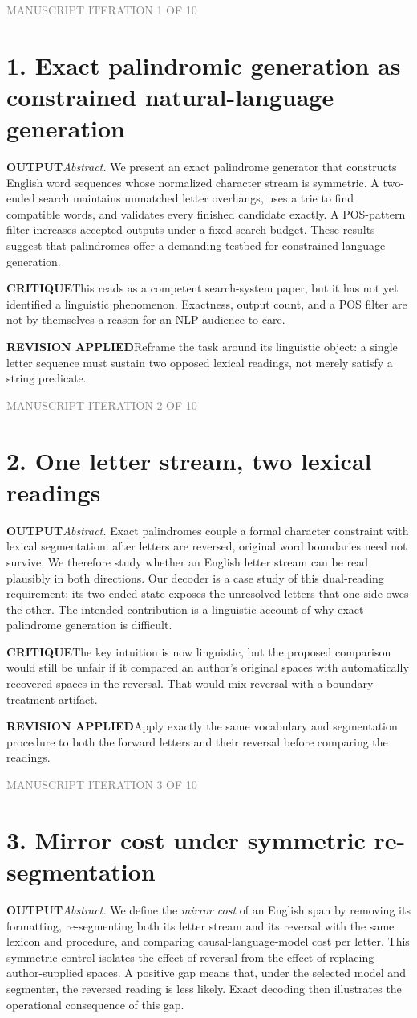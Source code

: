 \documentclass[10pt]{article}
\newcommand{\outputlabel}{\textcolor{teal!65!black}{\textbf{OUTPUT}}}
\newcommand{\critiquelabel}{\textcolor{red!65!black}{\textbf{CRITIQUE}}}
\newcommand{\reviselabel}{\textcolor{blue!65!black}{\textbf{REVISION APPLIED}}}
\newcommand{\pass}[1]{\textcolor{gray}{\small MANUSCRIPT ITERATION #1 OF 10}}
\begin{document}
\pass{1}
\section*{1. Exact palindromic generation as constrained natural-language generation}
\outputlabel\quad \emph{Abstract.} We present an exact palindrome generator that constructs English word sequences whose normalized character stream is symmetric. A two-ended search maintains unmatched letter overhangs, uses a trie to find compatible words, and validates every finished candidate exactly. A POS-pattern filter increases accepted outputs under a fixed search budget. These results suggest that palindromes offer a demanding testbed for constrained language generation.

\critiquelabel\quad This reads as a competent search-system paper, but it has not yet identified a linguistic phenomenon. Exactness, output count, and a POS filter are not by themselves a reason for an NLP audience to care.

\reviselabel\quad Reframe the task around its linguistic object: a single letter sequence must sustain two opposed lexical readings, not merely satisfy a string predicate.

\newpage
\pass{2}
\section*{2. One letter stream, two lexical readings}
\outputlabel\quad \emph{Abstract.} Exact palindromes couple a formal character constraint with lexical segmentation: after letters are reversed, original word boundaries need not survive. We therefore study whether an English letter stream can be read plausibly in both directions. Our decoder is a case study of this dual-reading requirement; its two-ended state exposes the unresolved letters that one side owes the other. The intended contribution is a linguistic account of why exact palindrome generation is difficult.

\critiquelabel\quad The key intuition is now linguistic, but the proposed comparison would still be unfair if it compared an author's original spaces with automatically recovered spaces in the reversal. That would mix reversal with a boundary-treatment artifact.

\reviselabel\quad Apply exactly the same vocabulary and segmentation procedure to both the forward letters and their reversal before comparing the readings.

\newpage
\pass{3}
\section*{3. Mirror cost under symmetric re-segmentation}
\outputlabel\quad \emph{Abstract.} We define the \emph{mirror cost} of an English span by removing its formatting, re-segmenting both its letter stream and its reversal with the same lexicon and procedure, and comparing causal-language-model cost per letter. This symmetric control isolates the effect of reversal from the effect of replacing author-supplied spaces. A positive gap means that, under the selected model and segmenter, the reversed reading is less likely. Exact decoding then illustrates the operational consequence of this gap.
\end{document}
